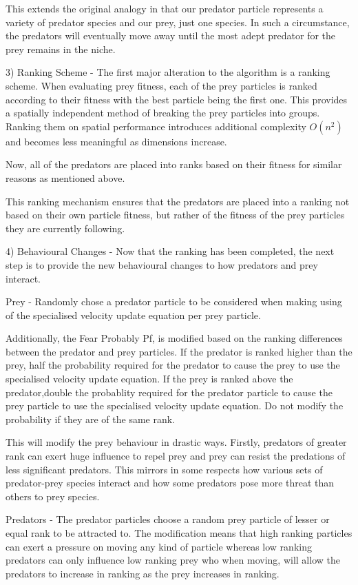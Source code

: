 \documentclass[12pt]{article}
\begin{document}
	This extends the original analogy in that our predator particle represents a variety of predator species and our prey, just one species. In such a circumstance, the predators will eventually move away until the most adept predator for the prey remains in the niche.

	3) Ranking Scheme - The first major alteration to the algorithm is a ranking scheme. When evaluating prey fitness, each of the prey particles is ranked according to their fitness with the best particle being the first one. This provides a spatially independent method of breaking the prey particles into groups. Ranking them on spatial performance introduces additional complexity $O(n^2)$ and becomes less meaningful as dimensions increase.

	Now, all of the predators are placed into ranks based on their fitness for similar reasons as mentioned above.

	This ranking mechanism ensures that the predators are placed into a ranking not based on their own particle fitness, but rather of the fitness of the prey particles they are currently following. 

	4) Behavioural Changes - Now that the ranking has been completed, the next step is to provide the new behavioural changes to how predators and prey interact. 

		Prey - Randomly chose a predator particle to be considered when making using of the specialised velocity update equation per prey particle.

		Additionally, the Fear Probably Pf, is modified based on the ranking differences between the predator and prey particles. If the predator is ranked higher than the prey, half the probability required for the predator to cause the prey to use the specialised velocity update equation. If the prey is ranked above the predator,double the probablity required for the predator particle to cause the prey particle to use the specialised velocity update equation. Do not modify the probability if they are of the same rank. 

		This will modify the prey behaviour in drastic ways. Firstly, predators of greater rank can exert huge influence to repel prey and prey can resist the predations of less significant predators. This mirrors in some respects how various sets of predator-prey species interact and how some predators pose more threat than others to prey species.

		Predators - The predator particles choose a random prey particle of lesser or equal rank to be attracted to. The modification means that high ranking particles can exert a pressure on moving any kind of particle whereas low ranking predators can only influence low ranking prey who when moving, will allow the predators to increase in ranking as the prey increases in ranking.
\end{document}
